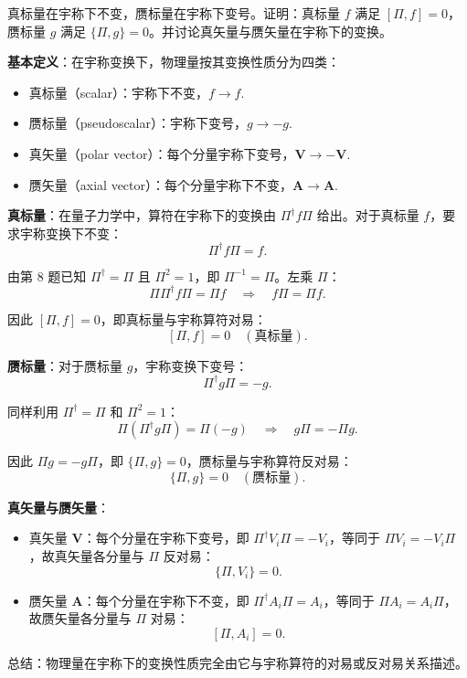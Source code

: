 \begin{question}
真标量在宇称下不变，赝标量在宇称下变号。证明：真标量 $f$ 满足 $[\Pi,f]=0$，赝标量 $g$ 满足 $\{\Pi,g\}=0$。并讨论真矢量与赝矢量在宇称下的变换。
\end{question}
\begin{solution}
	\textbf{基本定义}：在宇称变换下，物理量按其变换性质分为四类：
	\begin{itemize}
	\item 真标量（scalar）：宇称下不变，$f\to f$.
	\item 赝标量（pseudoscalar）：宇称下变号，$g\to -g$.
	\item 真矢量（polar vector）：每个分量宇称下变号，$\mathbf V\to -\mathbf V$.
	\item 赝矢量（axial vector）：每个分量宇称下不变，$\mathbf A\to \mathbf A$.
	\end{itemize}

	\textbf{真标量}：在量子力学中，算符在宇称下的变换由 $\Pi^\dagger f\Pi$ 给出。对于真标量 $f$，要求宇称变换下不变：
	\[
	\Pi^\dagger f\Pi = f.
	\]

	由第 8 题已知 $\Pi^\dagger=\Pi$ 且 $\Pi^2=1$，即 $\Pi^{-1}=\Pi$。左乘 $\Pi$：
	\[
	\Pi\Pi^\dagger f\Pi = \Pi f \quad\Longrightarrow\quad f\Pi = \Pi f.
	\]

	因此 $[\Pi, f]=0$，即真标量与宇称算符对易：
	\[
	\boxed{[\Pi,f]=0\quad(\text{真标量})}.
	\]

	\textbf{赝标量}：对于赝标量 $g$，宇称变换下变号：
	\[
	\Pi^\dagger g\Pi = -g.
	\]

	同样利用 $\Pi^\dagger=\Pi$ 和 $\Pi^2=1$：
	\[
	\Pi(\Pi^\dagger g\Pi)=\Pi(-g) \quad\Longrightarrow\quad g\Pi = -\Pi g.
	\]

	因此 $\Pi g = -g\Pi$，即 $\{\Pi,g\}=0$，赝标量与宇称算符反对易：
	\[
	\boxed{\{\Pi,g\}=0\quad(\text{赝标量})}.
	\]

	\textbf{真矢量与赝矢量}：
	\begin{itemize}
	\item 真矢量 $\mathbf V$：每个分量在宇称下变号，即 $\Pi^\dagger V_i\Pi = -V_i$，等同于 $\Pi V_i = -V_i\Pi$，故真矢量各分量与 $\Pi$ 反对易：
	\[
	\{\Pi,V_i\}=0.
	\]
	\item 赝矢量 $\mathbf A$：每个分量在宇称下不变，即 $\Pi^\dagger A_i\Pi = A_i$，等同于 $\Pi A_i = A_i\Pi$，故赝矢量各分量与 $\Pi$ 对易：
	\[
	[\Pi,A_i]=0.
	\]
	\end{itemize}

	总结：物理量在宇称下的变换性质完全由它与宇称算符的对易或反对易关系描述。
	\end{solution}

